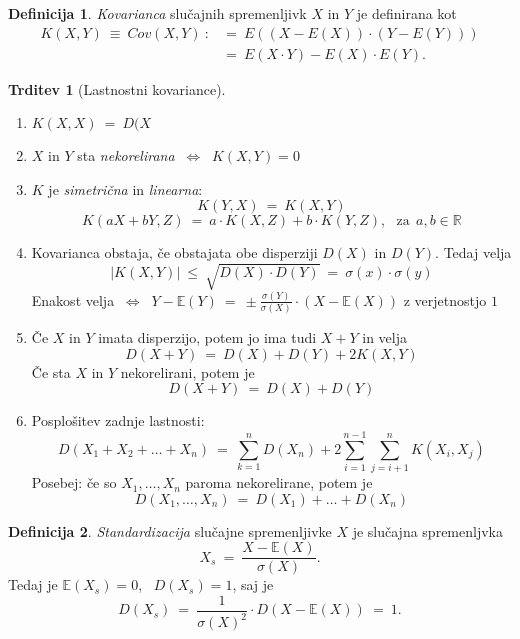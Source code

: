 \documentclass[11pt]{article}
\theoremstyle{definition}
\newtheorem{definicija}{Definicija}[section]
\theoremstyle{definition}
\newtheorem{trditev}{Trditev}[section]
\theoremstyle{definition}
\begin{document}
\begin{definicija}

\textit{Kovarianca} slučajnih spremenljivk $X$ in $Y$ je definirana kot 
\begin{align*}
K(X, Y) ~\equiv~ Cov(X, Y) ~:&=~ E((X - E(X)) \cdot (Y - E(Y))) \\
&=~ E(X \cdot Y) - E(X) \cdot E(Y).
\end{align*}


\end{definicija}
\vspace{0.5cm}

\begin{trditev}[Lastnostni kovariance]
~\\
\begin{enumerate}
	\item $K(X,X) ~=~ D(X$
	\item $X$ in $Y$ sta \textit{nekorelirana} $~\Leftrightarrow~$ $K(X, Y) = 0$
	\item $K$ je \textit{simetrična} in \textit{linearna}:
	$$K(Y, X) ~=~ K(X, Y)$$
	$$K(aX + bY, Z) ~=~ a \cdot K(X, Z) + b \cdot K(Y, Z), ~~~\text{za}~~ a, b \in \mathbb{R}$$
	\item Kovarianca obstaja, če obstajata obe disperziji $D(X)$ in $D(Y)$. Tedaj velja
	$$|K(X,Y)| ~\leq~ \sqrt{D(X) \cdot D(Y)} ~=~ \sigma(x) \cdot \sigma(y)$$
	Enakost velja $~\Leftrightarrow~$ $Y - \mathbb{E}(Y) ~=~ \pm \frac{\sigma(Y)}{\sigma(X)} \cdot (X - \mathbb{E}(X))$ z verjetnostjo $1$
	\item Če $X$ in $Y$ imata disperzijo, potem jo ima tudi $X+Y$ in velja
	$$D(X+Y) ~=~ D(X) + D(Y) + 2K(X,Y)$$
	Če sta $X$ in $Y$ nekorelirani, potem je
	$$D(X+Y) ~=~ D(X) + D(Y)$$
	\item Posplošitev  zadnje lastnosti:
	$$D(X_1 + X_2 + \ldots + X_n) ~=~ \sum_{k=1}^n D(X_n) + 2\sum_{i=1}^{n-1} \sum_{j=i+1}^n K(X_i, X_j)$$
	Posebej: če so $X_1, \ldots, X_n$ paroma nekorelirane, potem je 
	$$D(X_1, \ldots, X_n) ~=~ D(X_1) + \ldots + D(X_n)$$
\end{enumerate}
\end{trditev}
\vspace{0.5cm}

\begin{definicija}

\textit{Standardizacija} slučajne spremenljivke $X$ je slučajna spremenljvka
$$X_s ~=~ \frac{X - \mathbb{E}(X)}{\sigma(X)}.$$
Tedaj je $\mathbb{E}(X_s) = 0$, ~$D(X_s) = 1$, saj je
$$D(X_s) ~=~ \frac{1}{\sigma(X)^2} \cdot D(X - \mathbb{E}(X)) ~=~ 1.$$

\end{definicija}
\vspace{0.5cm}
\end{document}
